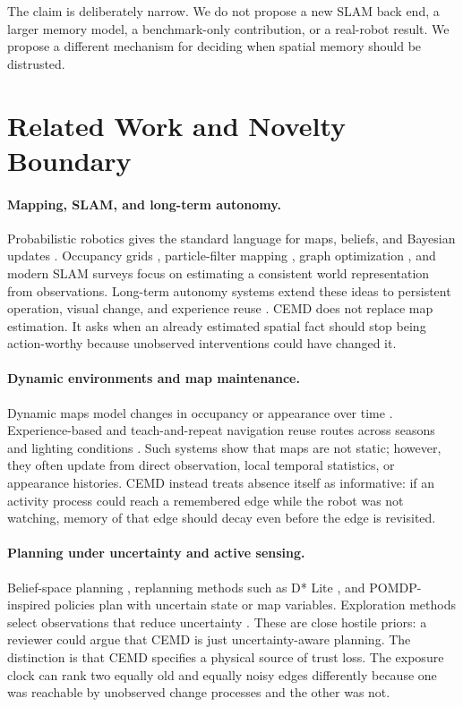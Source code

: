 \documentclass{article}
\begin{document}
The claim is deliberately narrow. We do not propose a new SLAM back end, a larger memory model, a benchmark-only contribution, or a real-robot result. We propose a different mechanism for deciding when spatial memory should be distrusted.

\section{Related Work and Novelty Boundary}

\paragraph{Mapping, SLAM, and long-term autonomy.}
Probabilistic robotics gives the standard language for maps, beliefs, and Bayesian updates \citep{thrun2005probabilistic}. Occupancy grids \citep{elfes1989occupancy}, particle-filter mapping \citep{grisetti2007improved}, graph optimization \citep{kummerle2011g2o}, and modern SLAM surveys \citep{cadena2016slam} focus on estimating a consistent world representation from observations. Long-term autonomy systems extend these ideas to persistent operation, visual change, and experience reuse \citep{biber2005dynamic,pradalier2005persistent,churchill2013experience,dayoub2008adaptive,lowry2016visual}. CEMD does not replace map estimation. It asks when an already estimated spatial fact should stop being action-worthy because unobserved interventions could have changed it.

\paragraph{Dynamic environments and map maintenance.}
Dynamic maps model changes in occupancy or appearance over time \citep{biber2005dynamic}. Experience-based and teach-and-repeat navigation reuse routes across seasons and lighting conditions \citep{churchill2013experience}. Such systems show that maps are not static; however, they often update from direct observation, local temporal statistics, or appearance histories. CEMD instead treats absence itself as informative: if an activity process could reach a remembered edge while the robot was not watching, memory of that edge should decay even before the edge is revisited.

\paragraph{Planning under uncertainty and active sensing.}
Belief-space planning \citep{prentice2009belief}, replanning methods such as D* Lite \citep{koenig2002dstar}, and POMDP-inspired policies \citep{karkus2017qmdp} plan with uncertain state or map variables. Exploration methods select observations that reduce uncertainty \citep{yamauchi1997frontier,stachniss2005information}. These are close hostile priors: a reviewer could argue that CEMD is just uncertainty-aware planning. The distinction is that CEMD specifies a physical source of trust loss. The exposure clock can rank two equally old and equally noisy edges differently because one was reachable by unobserved change processes and the other was not.
\end{document}
